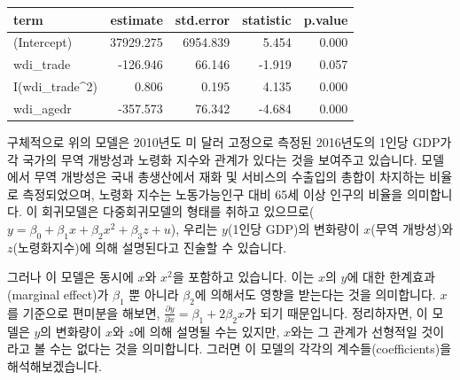 \documentclass[
]{book}
\newenvironment{Shaded}{\begin{snugshade}}{\end{snugshade}}
\newcommand{\DataTypeTok}[1]{\textcolor[rgb]{0.13,0.29,0.53}{#1}}
\newcommand{\DecValTok}[1]{\textcolor[rgb]{0.00,0.00,0.81}{#1}}
\newcommand{\KeywordTok}[1]{\textcolor[rgb]{0.13,0.29,0.53}{\textbf{#1}}}
\newcommand{\NormalTok}[1]{#1}
\newcommand{\OperatorTok}[1]{\textcolor[rgb]{0.81,0.36,0.00}{\textbf{#1}}}
\newcommand{\StringTok}[1]{\textcolor[rgb]{0.31,0.60,0.02}{#1}}
\begin{document}
\begin{Shaded}
\end{Shaded}

\begin{tabular}{l|r|r|r|r}
\hline
term & estimate & std.error & statistic & p.value\\
\hline
(Intercept) & 37929.275 & 6954.839 & 5.454 & 0.000\\
\hline
wdi\_trade & -126.946 & 66.146 & -1.919 & 0.057\\
\hline
I(wdi\_trade\textasciicircum{}2) & 0.806 & 0.195 & 4.135 & 0.000\\
\hline
wdi\_agedr & -357.573 & 76.342 & -4.684 & 0.000\\
\hline
\end{tabular}

구체적으로 위의 모델은 2010년도 미 달러 고정으로 측정된 2016년도의 1인당 GDP가 각 국가의 무역 개방성과 노령화 지수와 관계가 있다는 것을 보여주고 있습니다. 모델에서 무역 개방성은 국내 총생산에서 재화 및 서비스의 수출입의 총합이 차지하는 비율로 측정되었으며, 노령화 지수는 노동가능인구 대비 65세 이상 인구의 비율을 의미합니다. 이 회귀모델은 다중회귀모델의 형태를 취하고 있으므로(\(y = \beta_0 + \beta_1x + \beta_2x^2 + \beta_3z + u\)), 우리는 \(y\)(1인당 GDP)의 변화량이 \(x\)(무역 개방성)와 \(z\)(노령화지수)에 의해 설명된다고 진술할 수 있습니다.

그러나 이 모델은 동시에 \(x\)와 \(x^2\)을 포함하고 있습니다. 이는 \(x\)의 \(y\)에 대한 한계효과(marginal effect)가 \(\beta_1\) 뿐 아니라 \(\beta_2\)에 의해서도 영향을 받는다는 것을 의미합니다. \(x\)를 기준으로 편미분을 해보면, \(\frac{\partial y}{\partial x} = \beta_1 + 2\beta_2x\)가 되기 때문입니다. 정리하자면, 이 모델은 \(y\)의 변화량이 \(x\)와 \(z\)에 의해 설명될 수는 있지만, \(x\)와는 그 관계가 선형적일 것이라고 볼 수는 없다는 것을 의미합니다. 그러면 이 모델의 각각의 계수들(coefficients)을 해석해보겠습니다.
\end{document}
